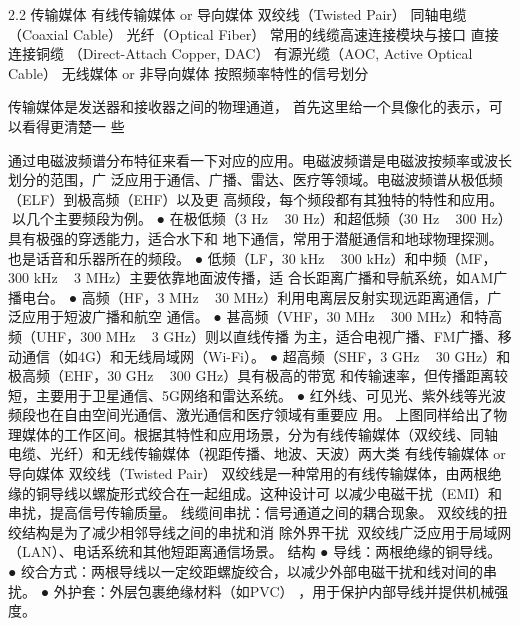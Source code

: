 
2.2 传输媒体
有线传输媒体 or 导向媒体
 双绞线（Twisted Pair）
 同轴电缆（Coaxial Cable）
 光纤（Optical Fiber）
 常用的线缆高速连接模块与接口
  直接连接铜缆 （Direct-Attach Copper, DAC）
  有源光缆（AOC, Active Optical Cable）
无线媒体 or 非导向媒体
 按照频率特性的信号划分

传输媒体是发送器和接收器之间的物理通道， 首先这里给一个具像化的表示，可以看得更清楚一
些




通过电磁波频谱分布特征来看一下对应的应用。电磁波频谱是电磁波按频率或波长划分的范围，广
泛应用于通信、广播、雷达、医疗等领域。电磁波频谱从极低频（ELF）到极高频（EHF）以及更
高频段，每个频段都有其独特的特性和应用。
以几个主要频段为例。
 ● 在极低频（3 Hz ~ 30 Hz）和超低频（30 Hz ~ 300 Hz）具有极强的穿透能力，适合水下和
   地下通信，常用于潜艇通信和地球物理探测。也是话音和乐器所在的频段。
 ● 低频（LF，30 kHz ~ 300 kHz）和中频（MF，300 kHz ~ 3 MHz）主要依靠地面波传播，适
   合长距离广播和导航系统，如AM广播电台。
 ● 高频（HF，3 MHz ~ 30 MHz）利用电离层反射实现远距离通信，广泛应用于短波广播和航空
   通信。
 ● 甚高频（VHF，30 MHz ~ 300 MHz）和特高频（UHF，300 MHz ~ 3 GHz）则以直线传播
   为主，适合电视广播、FM广播、移动通信（如4G）和无线局域网（Wi-Fi）。
 ● 超高频（SHF，3 GHz ~ 30 GHz）和极高频（EHF，30 GHz ~ 300 GHz）具有极高的带宽
   和传输速率，但传播距离较短，主要用于卫星通信、5G网络和雷达系统。
 ● 红外线、可见光、紫外线等光波频段也在自由空间光通信、激光通信和医疗领域有重要应
   用。
上图同样给出了物理媒体的工作区间。根据其特性和应用场景，分为有线传输媒体（双绞线、同轴
电缆、光纤）和无线传输媒体（视距传播、地波、天波）两大类
有线传输媒体 or 导向媒体
双绞线（Twisted Pair）
双绞线是一种常用的有线传输媒体，由两根绝缘的铜导线以螺旋形式绞合在一起组成。这种设计可
以减少电磁干扰（EMI）和串扰，提高信号传输质量。
线缆间串扰：信号通道之间的耦合现象。 双绞线的扭绞结构是为了减少相邻导线之间的串扰和消
除外界干扰
双绞线广泛应用于局域网（LAN）、电话系统和其他短距离通信场景。
结构
 ● 导线：两根绝缘的铜导线。
 ● 绞合方式：两根导线以一定绞距螺旋绞合，以减少外部电磁干扰和线对间的串扰。
 ● 外护套：外层包裹绝缘材料（如PVC）
                    ，用于保护内部导线并提供机械强度。




